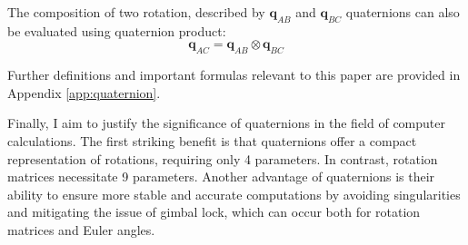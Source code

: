 The composition of two rotation, described by $\mathbf{q}_{AB}$ and $\mathbf{q}_{BC}$ quaternions can also be evaluated using quaternion product:
\begin{equation}
    \mathbf{q}_{AC}=\mathbf{q}_{AB}\otimes\mathbf{q}_{BC}
\end{equation}

Further definitions and important formulas relevant to this paper are provided in Appendix \ref{app:quaternion}.

Finally, I aim to justify the significance of quaternions in the field of computer calculations. The first striking benefit is that quaternions offer a compact representation of rotations, requiring only 4 parameters. In contrast, rotation matrices necessitate  9 parameters. Another advantage of quaternions is their ability to ensure more stable and accurate computations by avoiding singularities and mitigating the issue of gimbal lock, which can occur both for rotation matrices and Euler angles.